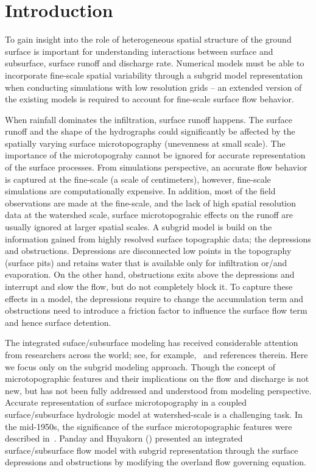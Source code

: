 \documentclass[review,11pt]{elsarticle}
\begin{document}
\linenumbers

\section{Introduction}\label{introduction}
 
To gain insight into the role of heterogeneous spatial structure of the ground surface is important for understanding interactions between surface and subsurface, surface runoff and discharge rate. Numerical models must be able to incorporate fine-scale spatial variability through a subgrid model representation when conducting simulations with low resolution grids -- an extended version of the existing models is required to account for fine-scale surface flow behavior. 

When rainfall dominates the infiltration, surface runoff happens. The surface runoff and the shape of the hydrographs could significantly be affected by the spatially varying surface microtopography (unevenness at small scale). The importance of the microtopograhy  cannot be ignored for accurate representation of the surface processes. From simulations perspective, an accurate flow behavior is captured at the fine-scale (a scale of centimeters), however, fine-scale simulations are computationally expensive. In addition, most of the field observations are made at the fine-scale, and the lack of high spatial resolution data at the watershed scale, surface microtopograhic effects on the runoff are usually ignored at larger spatial scales. A subgrid model is build on the information gained from highly resolved surface topographic data; the depressions and obstructions. Depressions are disconnected low points in the topography (surface pits) and retains water that is available only for infiltration or/and evaporation. On the other hand, obstructions exits above the depressions and interrupt and slow the flow, but do not completely block it. To capture these effects in a model, the depressions require to change the accumulation term and obstructions need to introduce a friction factor to influence the surface flow term and hence surface detention.

The integrated suface/subsurface modeling has received considerable attention from researchers across the world; see, for example,~\cite{painter2013modeling,kurylyk2014climate,spainter2016integrated} and references therein. Here we focus only on the subgrid modeling approach. Though the concept of microtopographic features and their implications on the flow and discharge is not new, but has not been fully addressed and understood from modeling perspective. Accurate representation of surface microtopography in a coupled surface/subsurface hydrologic model at watershed-scale is a challenging task. In the mid-1950s, the significance of the surface microtopographic features were described in~\cite{stammers1956effect}. Panday and Huyakorn (\citeyear{panday2004fully}) presented an integrated surface/subsurface flow model with subgrid representation through the surface depressions and obstructions by modifying the overland flow governing equation.
\end{document}
